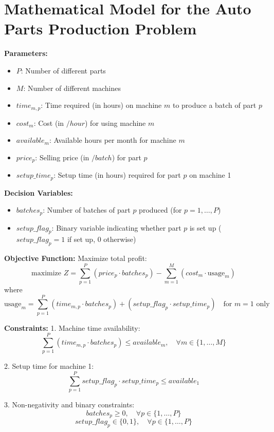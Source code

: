 \documentclass{article}
\begin{document}
\section*{Mathematical Model for the Auto Parts Production Problem}

\textbf{Parameters:}
\begin{itemize}
    \item $P$: Number of different parts
    \item $M$: Number of different machines
    \item $time_{m,p}$: Time required (in hours) on machine $m$ to produce a batch of part $p$
    \item $cost_{m}$: Cost (in $/hour$) for using machine $m$
    \item $available_{m}$: Available hours per month for machine $m$
    \item $price_{p}$: Selling price (in $/batch$) for part $p$
    \item $setup\_time_{p}$: Setup time (in hours) required for part $p$ on machine 1
\end{itemize}

\textbf{Decision Variables:}
\begin{itemize}
    \item $batches_{p}$: Number of batches of part $p$ produced (for $p = 1, \ldots, P$)
    \item $setup\_flag_{p}$: Binary variable indicating whether part $p$ is set up ($setup\_flag_{p} = 1$ if set up, $0$ otherwise)
\end{itemize}

\textbf{Objective Function:} 
Maximize total profit:
\[
\text{maximize } Z = \sum_{p=1}^{P} (price_{p} \cdot batches_{p}) - \sum_{m=1}^{M} \left( cost_{m} \cdot \text{usage}_{m} \right)
\]
where
\[
\text{usage}_{m} = \sum_{p=1}^{P} (time_{m,p} \cdot batches_{p}) + (setup\_flag_{p} \cdot setup\_time_{p}) \quad \text{for } m=1 \text{ only}
\]

\textbf{Constraints:}
1. Machine time availability:
\[
\sum_{p=1}^{P} (time_{m,p} \cdot batches_{p}) \leq available_{m}, \quad \forall m \in \{1, \ldots, M\}
\]

2. Setup time for machine 1:
\[
\sum_{p=1}^{P} setup\_flag_{p} \cdot setup\_time_{p} \leq available_{1}
\]

3. Non-negativity and binary constraints:
\[
batches_{p} \geq 0, \quad \forall p \in \{1, \ldots, P\}
\]
\[
setup\_flag_{p} \in \{0, 1\}, \quad \forall p \in \{1, \ldots, P\}
\]
\end{document}
